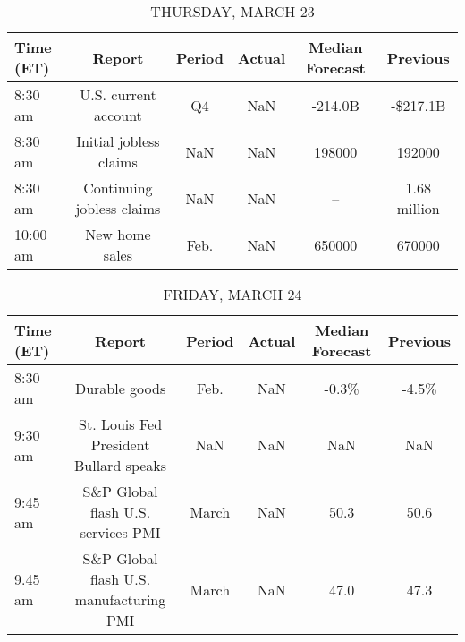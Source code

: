 \documentclass{article}%
\begin{document}
\begin{table}[htbp]%
\caption{THURSDAY, MARCH 23}%
\centering%
\begin{adjustbox}{width=1\textwidth}%
\begin{tabular}{lccccc}
\toprule
Time (ET) &                    Report & Period & Actual & Median Forecast &     Previous \\
\midrule
  8:30 am &      U.S. current account &     Q4 &    NaN &         -214.0B &     -\$217.1B \\
  8:30 am &    Initial jobless claims &    NaN &    NaN &          198000 &       192000 \\
  8:30 am & Continuing jobless claims &    NaN &    NaN &              -- & 1.68 million \\
 10:00 am &            New home sales &   Feb. &    NaN &          650000 &       670000 \\
\bottomrule
\end{tabular}
%
\end{adjustbox}%
\end{table}

%


\begin{table}[htbp]%
\caption{FRIDAY, MARCH 24}%
\centering%
\begin{adjustbox}{width=1\textwidth}%
\begin{tabular}{lccccc}
\toprule
Time (ET) &                                  Report & Period & Actual & Median Forecast & Previous \\
\midrule
  8:30 am &                           Durable goods &   Feb. &    NaN &           -0.3\% &    -4.5\% \\
  9:30 am &  St. Louis Fed President Bullard speaks &    NaN &    NaN &             NaN &      NaN \\
  9:45 am &      S\&P Global flash U.S. services PMI &  March &    NaN &            50.3 &     50.6 \\
  9.45 am & S\&P Global flash U.S. manufacturing PMI &  March &    NaN &            47.0 &     47.3 \\
\bottomrule
\end{tabular}
%
\end{adjustbox}%
\end{table}
\end{document}
